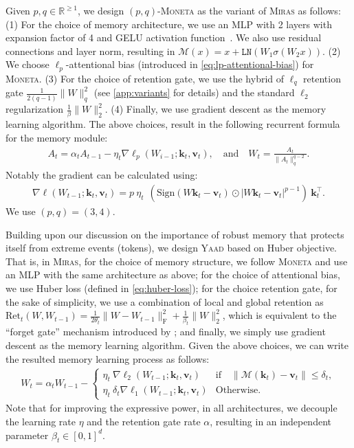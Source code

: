 \documentclass{article}
\newcommand{\citep}{\parencite}
\newcommand{\citet}{\textcite}
\newcommand{\framework}[0]{\textsc{Miras}}
\newcommand{\ymodel}[0]{\textsc{Yaad}}
\newcommand{\mmodel}[0]{\textsc{Moneta}}
\newcommand{\R}[0]{\mathbb{R}}
\newcommand{\vk}[0]{\mathbf{k}}
\newcommand{\vvv}[0]{\mathbf{v}}
\newcommand{\M}[0]{\mathcal{M}}
\theoremstyle{plain}
\theoremstyle{definition}
\theoremstyle{remark}
\newcommand{\head}[1]{\vspace{1.7mm}\noindent{{\textcolor{c2}{\bf #1.}}}}
\begin{document}
\head{\mmodel}
Given $p, q \in\R^{\geq 1}$, we design $(p, q)$-\mmodel{} as the variant of \framework{} as follows: (1) For the choice of memory architecture, we use an MLP with 2 layers with expansion factor of 4 and GELU activation function~\citep{hendrycks2016gaussian}. We also use residual connections and layer norm, resulting in $\M(x) = x + \texttt{LN}(W_1 \sigma(W_2 x))$. (2) We choose $\ell_p$-attentional bias (introduced in \autoref{eq:lp-attentional-bias}) for \mmodel. (3) For the choice of retention gate, we use the hybrid of $\ell_q$ retention gate $\frac{1}{2(q-1)} \|W\|_q^2$ (see \autoref{app:variants} for details) and the standard $\ell_2$ regularization $\frac{1}{\beta} \|W\|_2^2$. (4) Finally, we use gradient descent as the memory learning algorithm. The above choices, result in the following recurrent formula for the memory module:
\begin{align}\label{eq:q-norm}
    A_t = \alpha_t A_{t-1} - \eta_t \nabla \ell_p(W_{i-1};\vk_t, \vvv_t),
\quad
\textrm{and}
\quad
W_t = \frac{A_t}{\|A_t\|_q^{q-2}}.
\end{align}
Notably the gradient can be calculated using:
\begin{align}
   \nabla \ell (W_{t-1}; \vk_t, \vvv_t) =  p \: \eta_t \:\: \left(\mbox{Sign}(W \vk_t - \vvv_t) \odot|W \vk_t - \vvv_t|^{p-1}\right)\:\vk_t^{\top}.
\end{align}
We use $(p, q)=(3, 4)$.

\head{\ymodel}
Building upon our discussion on the importance of robust memory that protects itself from extreme events (tokens), we design \ymodel{} based on Huber objective. That is, in \framework, for the choice of memory structure, we follow \mmodel{} and use an MLP with the same architecture as above; for the choice of attentional bias, we use Huber loss (defined in \autoref{eq:huber-loss}); for the choice retention gate, for the sake of simplicity, we use a combination of local and global retention as $\mbox{Ret}_t (W, W_{t-1}) = \frac{1}{2 \theta_t} \|W - W_{t-1}\|_{\text{F}}^2 + \frac{1}{\beta_t} \|W\|_2^2$, which is equivalent to the ``forget gate'' mechanism introduced by \citet{behrouz2024titans}; and finally, we simply use gradient descent as the memory learning algorithm.  Given the above choices, we can write the resulted memory learning process as follows:
\begin{align}
    W_t = \alpha_t W_{t-1} - \begin{cases} 
    \eta_t \: \nabla \ell_2 (W_{t-1}; \vk_t, \vvv_t)   &  \text{if} \quad \| \M(\vk_t) - \vvv_t \| \leq \delta_t, \\
    \eta_t \: \delta_t \nabla  \ell_1 (W_{t-1}; \vk_t, \vvv_t)  & \text{Otherwise}.
    \end{cases} 
\end{align}
Note that for improving the expressive power, in all architectures, we decouple the learning rate $\eta$ and the retention gate rate $\alpha$, resulting in an independent parameter $\beta_t \in [0, 1]^d$.   
\end{document}
